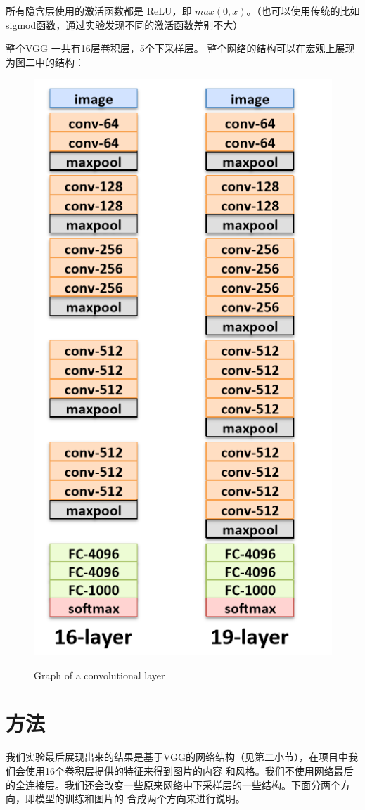 \documentclass[10pt,a4paper]{ctexart}
\begin{document}
    所有隐含层使用的激活函数都是 ReLU\cite{Dahl2013Improving}，即 $ max(0,x)$。（也可以使用传统的比如sigmod函数，通过实验发现不同的激活函数差别不大）
	
    整个VGG 一共有16层卷积层，5个下采样层。
	整个网络的结构可以在宏观上展现为图二中的结构：
	\begin{figure}[h]
		\centering
		{\includegraphics[width=0.8\linewidth]{vgg.png}}
		\caption{Graph of a convolutional layer}
	\end{figure}
	\section{方法}
    我们实验最后展现出来的结果是基于VGG的网络结构（见第二小节），在项目中我们会使用16个卷积层提供的特征来得到图片的内容
    和风格。我们不使用网络最后的全连接层。我们还会改变一些原来网络中下采样层的一些结构。下面分两个方向，即模型的训练和图片的
    合成两个方向来进行说明。
\end{document}
